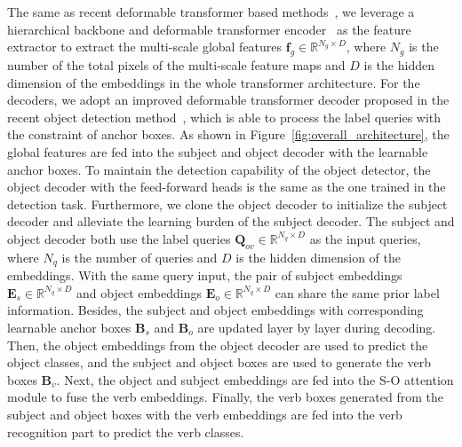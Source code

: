 \documentclass[10pt,twocolumn,letterpaper]{article}
\begin{document}
\quad The same as recent deformable transformer based methods~\cite{cjw_qahoi,Kim_2022_CVPR,ma2023fgahoi}, we leverage a hierarchical backbone and deformable transformer encoder~\cite{zhu2020deformable} as the feature extractor to extract the multi-scale global features $\bm{f}_g\in\mathbb{R}^{N_g\times D}$, where $N_g$ is the number of the total pixels of the multi-scale feature maps and $D$ is the hidden dimension of the embeddings in the whole transformer architecture.
For the decoders, we adopt an improved deformable transformer decoder proposed in the recent object detection method~\cite{liu2022dabdetr}, which is able to process the label queries with the constraint of anchor boxes.
As shown in Figure~\ref{fig:overall_architecture}, the global features are fed into the subject and object decoder with the learnable anchor boxes.
To maintain the detection capability of the object detector, the object decoder with the feed-forward heads is the same as the one trained in the detection task.
Furthermore, we clone the object decoder to initialize the subject decoder and alleviate the learning burden of the subject decoder.
The subject and object decoder both use the label queries $\bm{Q}_{ov}\in\mathbb{R}^{N_q\times D}$ as the input queries, where $N_q$ is the number of queries and $D$ is the hidden dimension of the embeddings.
With the same query input, the pair of subject embeddings $\bm{E}_s\in\mathbb{R}^{N_q\times D}$ and object embeddings $\bm{E}_o\in\mathbb{R}^{N_q\times D}$ can share the same prior label information.
Besides, the subject and object embeddings with corresponding learnable anchor boxes $\bm{B}_s$ and $\bm{B}_o$ are updated layer by layer during decoding.
Then, the object embeddings from the object decoder are used to predict the object classes, and the subject and object boxes are used to generate the verb boxes $\bm{B}_v$.
Next, the object and subject embeddings are fed into the S-O attention module to fuse the verb embeddings.
Finally, the verb boxes generated from the subject and object boxes with the verb embeddings are fed into the verb recognition part to predict the verb classes.
\end{document}
